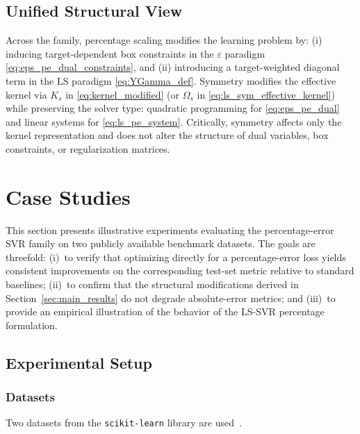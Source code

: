 \documentclass[mathematics,article,submit,pdftex,moreauthors]{Definitions/mdpi}
\begin{document}
\subsection{Unified Structural View}\label{subsec:unified_view}

\begin{Remark}\label{rem:structural_family}
Across the family, percentage scaling modifies the learning problem by:
(i) inducing target-dependent box constraints in the $\varepsilon$ paradigm \eqref{eq:eps_pe_dual_constraints}, and
(ii) introducing a target-weighted diagonal term in the LS paradigm \eqref{eq:YGamma_def}.
Symmetry modifies the effective kernel via $K_s$ in \eqref{eq:kernel_modified} (or $\Omega_s$ in \eqref{eq:ls_sym_effective_kernel}) 
while preserving the solver type: quadratic programming for \eqref{eq:eps_pe_dual} and linear systems for \eqref{eq:ls_pe_system}.
Critically, symmetry affects only the kernel representation and does not alter the structure of dual variables, 
box constraints, or regularization matrices.
\end{Remark}

\section{Case Studies}\label{sec:case_studies}

This section presents illustrative experiments evaluating the
percentage-error SVR family on two publicly available benchmark
datasets.
The goals are threefold:
(i)~to verify that optimizing directly for a percentage-error
loss yields consistent improvements on the corresponding
test-set metric relative to standard baselines;
(ii)~to confirm that the structural modifications derived in
Section~\ref{sec:main_results} do not degrade absolute-error
metrics; and
(iii)~to provide an empirical illustration of the behavior
of the LS-SVR percentage formulation.

\subsection{Experimental Setup}\label{subsec:setup}

\subsubsection{Datasets}

Two datasets from the \texttt{scikit-learn} library are
used~\cite{Pedregosa2011}.
\end{document}
